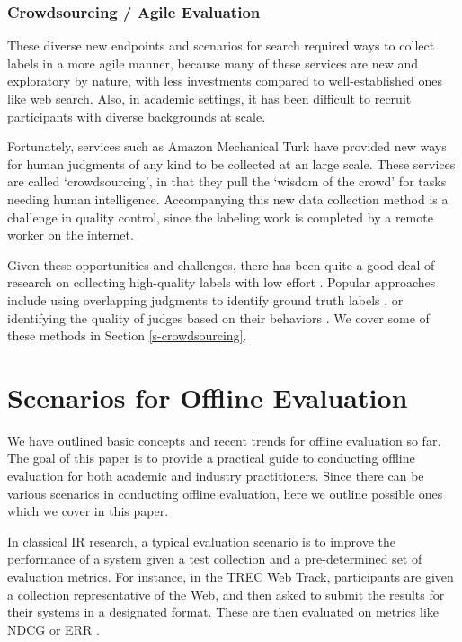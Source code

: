 \subsubsection{Crowdsourcing / Agile Evaluation}

These diverse new endpoints and scenarios for search required ways to collect labels in a more agile manner, because many of these services are new and exploratory by nature, with less investments compared to well-established ones like web search. Also, in academic settings, it has been difficult to recruit participants with diverse backgrounds at scale.

Fortunately, services such as Amazon Mechanical Turk have provided new ways for human judgments of any kind to be collected at an large scale. These services are called `crowdsourcing', in that they pull the `wisdom of the crowd' for tasks needing human intelligence. Accompanying this new data collection method is a challenge in quality control, since the labeling work is completed by a remote worker on the internet.

Given these opportunities and challenges, there has been quite a good deal of research on collecting high-quality labels with low effort \citep{Alonso2012}. Popular approaches include using overlapping judgments to identify ground truth labels \citep{Venanzi:2014}, or identifying the quality of judges based on their behaviors \citep{Kazai:2016}. We cover some of these methods in Section \ref{s-crowdsourcing}.


\section{Scenarios for Offline Evaluation}

We have outlined basic concepts and recent trends for offline evaluation so far. The goal of this paper is to provide a practical guide to conducting offline evaluation for both academic and industry practitioners. Since there can be various scenarios in conducting offline evaluation, here we outline possible ones which we cover in this paper.

In classical IR research, a typical evaluation scenario is to improve the performance of a system given a test collection and a pre-determined set of evaluation metrics. For instance, in the TREC Web Track, participants are given a collection representative of the Web, and then asked to submit the results for their systems in a designated format. These are then evaluated on metrics like NDCG \citep{Jarvelin:2002} or ERR \citep{ChapelleMZG09}.

